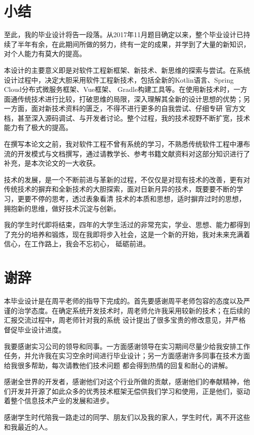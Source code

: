 \documentclass[titlepage,UTF8,linespread=1.5]{ctexart}
\begin{document}
\section{小结}
至此，我的毕业设计将告一段落。从2017年11月题目确定以来，整个毕业设计已持续了半年有余，在此期间所做的努力，终有一定的成果，并学到了大量的新知识，对个人能力有莫大的提高。\par
本设计的主要意义即是对软件工程新框架、新技术、新思维的探索与尝试。在系统设计过程中，决定大胆采用软件工程新技术，包括全新的Kotlin语言、Spring Cloud分布式微服务框架、Vue框架、
Gradle构建工具等。在使用新技术时，一方面通传统技术进行比较，打破思维的局限，深入理解其全新的设计思想的优势；另一方面，面对新技术资料的匮乏，不得不进行更多的自我尝试、仔细专研
官方文档，甚至深入源码调试、与开发者讨论。整个过程，我的技术视野不断扩宽，技术能力有了极大的提高。\par
在撰写本论文之前，我对软件工程不曾有系统的学习，不熟悉传统软件工程中瀑布流的开发模式与文档撰写，通过请教学长、参考书籍文献资料对这部分知识进行了补充，是本次论文的一大收获。\par
技术的发展，是一个不断前进与革新的过程，不仅仅是对现有技术的改善，更有对传统技术的摒弃和全新技术的大胆探索，面对日新月异的技术，既要要不断的学习，更要不停的思考，透过表象看清
技术的本质和思想，适时摒弃过时的思想，拥抱新的思维，做好技术沉淀与创新。\par
我的学生时代即将结束，四年的大学生活过的非常充实，学业、思想、能力都得到了充分的培养和锻炼，现在我即将步入社会，这是一个新的开始，我对未来充满着信心，在工作路上，我会不忘初心，
砥砺前进。\par
\clearpage

\section*{谢辞}
本毕业设计是在周平老师的指导下完成的。首先要感谢周平老师包容的态度以及严谨的治学态度。在确定系统开发技术时，周老师允许我采用较新的技术；在后续的汇报交流过程中，周老师针对我的系统
设计提出了很多宝贵的修改意见，并严格督促毕业设计进度。\par
我要感谢实习公司的领导和同事。一方面感谢领导在实习期间尽量少给我安排工作任务，并允许我在实习空余时间进行毕业设计；另一方面感谢许多同事在技术方面给我很多帮助，每次请教他们技术问题
都会得到热情的回复和耐心的讲解。\par
感谢全世界的开发者，感谢他们对这个行业所做的贡献，感谢他们的奉献精神，他们开发并开源了如此众多的优秀技术框架无偿供我们学习和使用，正是他们，驱动着整个信息技术产业的发展和进步。\par
感谢学生时代陪我一路走过的同学、朋友们以及我的家人，学生时代，离不开这些和我最近的人。\par
\clearpage
\end{document}
